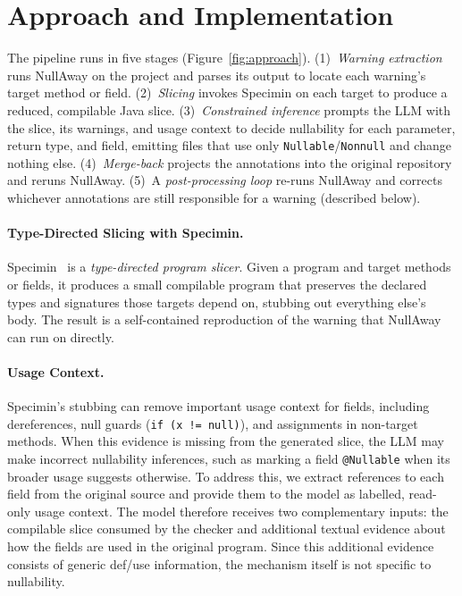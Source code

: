 \documentclass[sigplan,screen]{acmart}
\begin{document}
\section{Approach and Implementation}
\label{sec:approach}

The pipeline runs in five stages (Figure~\ref{fig:approach}). (1)~\emph{Warning extraction} runs NullAway on the project and parses its output to locate each warning's target method or field. (2)~\emph{Slicing} invokes Specimin on each target to produce a reduced, compilable Java slice. (3)~\emph{Constrained inference} prompts the LLM with the slice, its warnings, and usage context to decide nullability for each parameter, return type, and field, emitting files that use only \texttt{Nullable}/\texttt{Nonnull} and change nothing else. (4)~\emph{Merge-back} projects the annotations into the original repository and reruns NullAway. (5)~A \emph{post-processing loop} re-runs NullAway and corrects whichever annotations are still responsible for a warning (described below).

\paragraph{Type-Directed Slicing with Specimin.}
Specimin~\cite{nguyen2025static} is a \emph{type-directed program slicer}. Given a program and target methods or fields, it produces a small compilable program that preserves the declared types and signatures those targets depend on, stubbing out everything else's body. The result is a self-contained reproduction of the warning that NullAway can run on directly.

\paragraph{Usage Context.}
Specimin's stubbing can remove important usage context for fields, including dereferences, null guards (\texttt{if (x != null)}), and assignments in non-target methods. When this evidence is missing from the generated slice, the LLM may make incorrect nullability inferences, such as marking a field \texttt{@Nullable} when its broader usage suggests otherwise. To address this, we extract references to each field from the original source and provide them to the model as labelled, read-only usage context. The model therefore receives two complementary inputs: the compilable slice consumed by the checker and additional textual evidence about how the fields are used in the original program. Since this additional evidence consists of generic def/use information, the mechanism itself is not specific to nullability.
\end{document}
